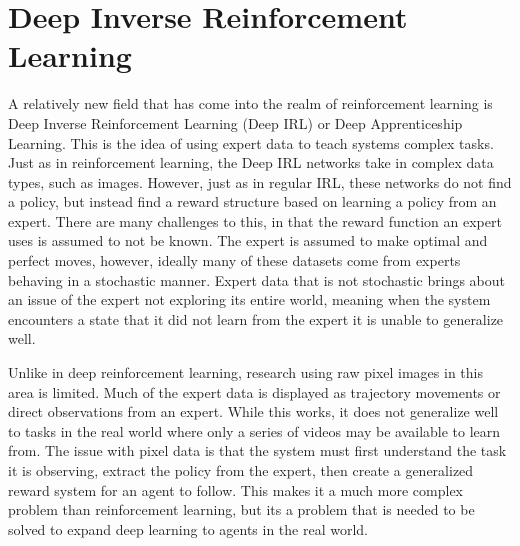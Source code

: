 \documentclass[12pt,american]{report}
\begin{document}
\section{Deep Inverse Reinforcement Learning}
A relatively new field that has come into the realm of reinforcement learning is Deep Inverse Reinforcement Learning (Deep IRL) or Deep Apprenticeship Learning.  This is the idea of using expert data to teach systems complex tasks.  Just as in reinforcement learning, the Deep IRL networks take in complex data types, such as images.  However, just as in regular IRL, these networks do not find a policy, but instead find a reward structure based on learning a policy from an expert.  There are many challenges to this, in that the reward function an expert uses is assumed to not be known.  The expert is assumed to make optimal and perfect moves, however, ideally many of these datasets come from experts behaving in a stochastic manner.  Expert data that is not stochastic brings about an issue of the expert not exploring its entire world, meaning when the system encounters a state that it did not learn from the expert it is unable to generalize well.  

Unlike in deep reinforcement learning, research using raw pixel images in this area is limited.  Much of the expert data is displayed as trajectory movements or direct observations from an expert.  While this works, it does not generalize well to tasks in the real world where only a series of videos may be available to learn from.  The issue with pixel data is that the system must first understand the task it is observing, extract the policy from the expert, then create a generalized reward system for an agent to follow.  This makes it a much more complex problem than reinforcement learning, but its a problem that is needed to be solved to expand deep learning to agents in the real world.
\end{document}
